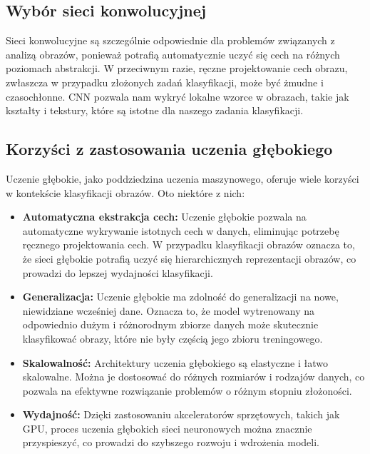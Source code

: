 \subsection{Wybór sieci konwolucyjnej}
Sieci konwolucyjne są szczególnie odpowiednie dla problemów związanych z analizą obrazów, ponieważ potrafią automatycznie uczyć się cech na różnych poziomach abstrakcji. W przeciwnym razie, ręczne projektowanie cech obrazu, zwłaszcza w przypadku złożonych zadań klasyfikacji, może być żmudne i czasochłonne. CNN pozwala nam wykryć lokalne wzorce w obrazach, takie jak kształty i tekstury, które są istotne dla naszego zadania klasyfikacji.

\subsection{Korzyści z zastosowania uczenia głębokiego}
Uczenie głębokie, jako poddziedzina uczenia maszynowego, oferuje wiele korzyści w kontekście klasyfikacji obrazów. Oto niektóre z nich:

\begin{itemize}
\item \textbf{Automatyczna ekstrakcja cech:} Uczenie głębokie pozwala na automatyczne wykrywanie istotnych cech w danych, eliminując potrzebę ręcznego projektowania cech. W przypadku klasyfikacji obrazów oznacza to, że sieci głębokie potrafią uczyć się hierarchicznych reprezentacji obrazów, co prowadzi do lepszej wydajności klasyfikacji.

\item \textbf{Generalizacja:} Uczenie głębokie ma zdolność do generalizacji na nowe, niewidziane wcześniej dane. Oznacza to, że model wytrenowany na odpowiednio dużym i różnorodnym zbiorze danych może skutecznie klasyfikować obrazy, które nie były częścią jego zbioru treningowego.

\item \textbf{Skalowalność:} Architektury uczenia głębokiego są elastyczne i łatwo skalowalne. Można je dostosować do różnych rozmiarów i rodzajów danych, co pozwala na efektywne rozwiązanie problemów o różnym stopniu złożoności.

\item \textbf{Wydajność:} Dzięki zastosowaniu akceleratorów sprzętowych, takich jak GPU, proces uczenia głębokich sieci neuronowych można znacznie przyspieszyć, co prowadzi do szybszego rozwoju i wdrożenia modeli.

\end{itemize}


